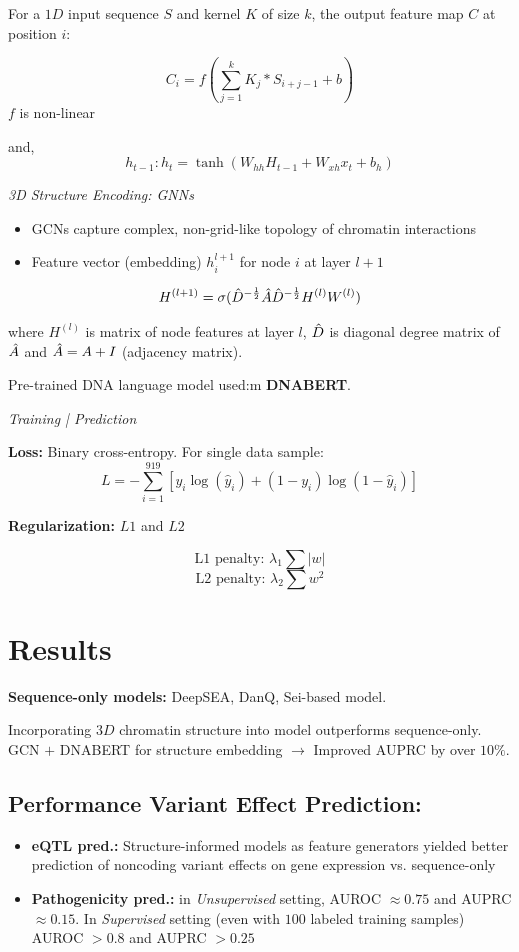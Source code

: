 \documentclass[../main.tex]{subfiles}
\begin{document}
\vspace{0.2cm}

For a $1D$ input sequence $S$ and kernel $K$ of size $k$, the output feature map $C$ at position $i$: 

\[
C_i = f(\sum^k_{j=1} K_j*S_{i+j-1} + b) 
\]
 $f$ is non-linear

and, 
\[
h_{t-1}:h_t=\tanh{(W_{hh}H_{t-1} +W_{xh}x_t+b_h)}
\]

\textit{3D Structure Encoding: GNNs}
\begin{itemize}
    \item GCNs capture complex, non-grid-like topology of chromatin interactions
    \item Feature vector (embedding) $h_i^{l+1}$ for node $i$ at layer $l+1$
\end{itemize}


\[
H^{(l+1)}=\sigma(\Hat{D}^{-\frac{1}{2}}\Hat{A}\Hat{D}^{-\frac{1}{2}}H^{(l)}W^{(l)})
\]

where $H^{(l)}$ is matrix of node features at layer $l$, $\Hat{D}$ is diagonal degree matrix of $\Hat{A}$ and $\Hat{A}=A+I$ (adjacency matrix).

Pre-trained DNA language model used:m \textbf{DNABERT}.

\textit{Training | Prediction}

\vspace{0.3cm}

\textbf{Loss:} Binary cross-entropy. For single data sample:
\[
L = -\sum_{i=1}^{919} \left[ y_i \log(\hat{y}_i) + (1 - y_i) \log(1 - \hat{y}_i) \right]
\]

\textbf{Regularization:} $L1$ and $L2$

\[
\text{L1 penalty: } \lambda_1 \sum |w|
\]
\[
\text{L2 penalty: } \lambda_2 \sum w^2
\]

\section{Results}

\textbf{Sequence-only models:} DeepSEA, DanQ, Sei-based model. 

Incorporating $3D$ chromatin structure into model outperforms sequence-only. GCN $+$ DNABERT for structure embedding $\rightarrow$ Improved AUPRC by over $10\%$.

\subsection{Performance Variant Effect Prediction:}
\begin{itemize}
    \item \textbf{eQTL pred.:} Structure-informed models as feature generators yielded better prediction of noncoding variant effects on gene expression vs. sequence-only
    \item \textbf{Pathogenicity pred.:} in \textit{Unsupervised} setting, AUROC $\approx0.75$ and AUPRC $\approx0.15$. In \textit{Supervised} setting (even with $100$ labeled training samples) AUROC $> 0.8$ and AUPRC $>0.25$
\end{itemize}
\end{document}
